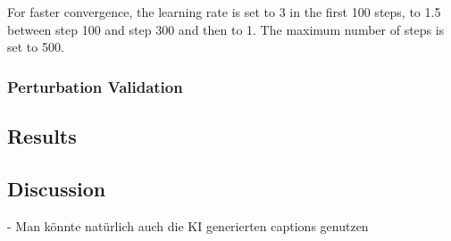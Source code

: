 For faster convergence, the learning rate is set to 3 in the first 100 steps, to 1.5 between step 100 and step 300 and then to 1. The maximum number of steps is set to 500.

\subsubsection{Perturbation Validation}






    





\subsection{Results}

\subsection{Discussion}

- Man könnte natürlich auch die KI generierten captions genutzen